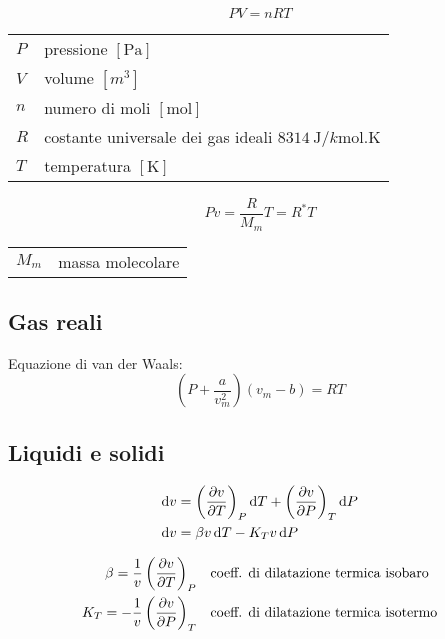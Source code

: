 \[PV = nRT\]
\begin{tabular}{ll}
    $P$ & pressione $[\si{\pascal}]$ \\
    $V$ & volume $[\si{m^3}]$ \\
    $n$ & numero di moli $[\si{\mol}]$ \\
    $R$ & costante universale dei gas ideali $\SI{8314}{\J/k\mol.\K}$ \\
    $T$ & temperatura $[\si{\K}]$
\end{tabular}

\[Pv = \frac{R}{M_m}T = R^*T \]
\begin{tabular}{ll}
    $M_m$ & massa molecolare \\
\end{tabular}

\subsection{Gas reali}
Equazione di van der Waals:
\[\left(P + \frac{a}{v_m^2}\right)(v_m-b) = RT\]

\subsection{Liquidi e solidi}
\begin{align*}
    \dd{v} &= \left(\pdv{v}{T}\right)_P \dd{T} + \left(\pdv{v}{P}\right)_T \dd{P} \\
    \dd{v} &= \beta v \dd{T} - K_T v \dd{P}
\end{align*}

\begin{align*}
    \beta = \frac{1}{v} \left(\pdv{v}{T}\right)_P & \quad \text{coeff. di dilatazione termica isobaro} \\
    K_T = -\frac{1}{v} \left(\pdv{v}{P}\right)_T & \quad \text{coeff. di dilatazione termica isotermo} \\
\end{align*}
